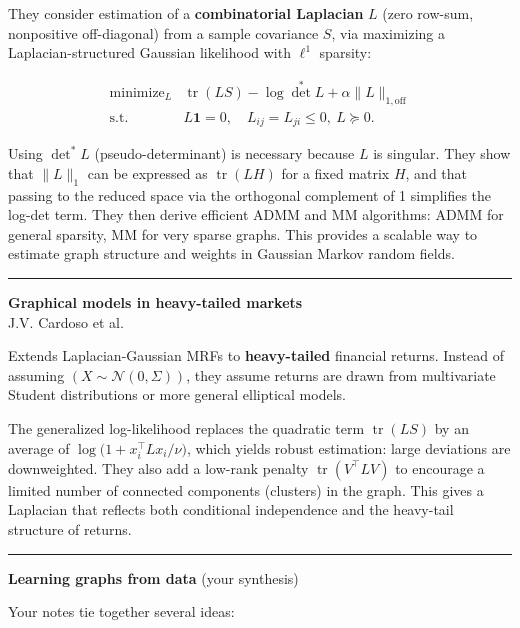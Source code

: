 \documentclass[a5paper]{article}
\let\le\leqslant
\begin{document}
They consider estimation of a \textbf{combinatorial Laplacian} $L$ (zero
row-sum, nonpositive off-diagonal) from a sample covariance $S$, via
maximizing a Laplacian-structured Gaussian likelihood with $\ell^1$ sparsity:

\[
\begin{array}{ll}
\text{minimize}_L & \operatorname{tr}(LS) - \log\det^\ast L + \alpha\|L\|_{1,\mathrm{off}} \\
\text{s.t.} & L\mathbf{1}=0,\quad L_{ij}=L_{ji}\le0,\ L\succeq 0.
\end{array}
\]

Using $\det^\ast L$ (pseudo-determinant) is necessary because $L$ is
singular. They show that $\|L\|_1$ can be expressed as
$\operatorname{tr}(LH)$ for a fixed matrix $H$, and that passing to the reduced space via
the orthogonal complement of 1 simplifies the log-det term. They then
derive efficient ADMM and MM algorithms: ADMM for general sparsity, MM
for very sparse graphs. This provides a scalable way to estimate graph
structure and weights in Gaussian Markov random fields.

\begin{center}\rule{0.5\linewidth}{0.5pt}\end{center}

\textbf{Graphical models in heavy-tailed markets}\\
J.V. Cardoso et al.

Extends Laplacian-Gaussian MRFs to \textbf{heavy-tailed} financial
returns. Instead of assuming $(X\sim \mathcal{N}(0,\Sigma))$, they assume returns
are drawn from multivariate Student distributions or more general
elliptical models.

The generalized log-likelihood replaces the quadratic term $\operatorname{tr}(LS)$ by an
average of $\log\!\bigl(1 + x_i^\top L x_i/\nu\bigr)$, which yields robust estimation: large
deviations are downweighted. They also add a low-rank penalty
$\operatorname{tr}(V^\top L V)$ to encourage a limited number of connected
components (clusters) in the graph. This gives a Laplacian that reflects
both conditional independence and the heavy-tail structure of returns.

\begin{center}\rule{0.5\linewidth}{0.5pt}\end{center}

\textbf{Learning graphs from data} (your synthesis)

Your notes tie together several ideas:
\end{document}
